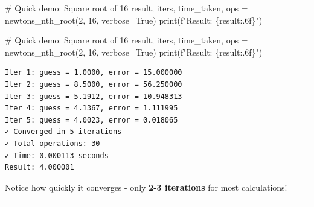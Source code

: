 \documentclass[
  letterpaper,
  DIV=11,
  numbers=noendperiod]{scrartcl}
\newenvironment{Shaded}{\begin{snugshade}}{\end{snugshade}}
\newcommand{\BuiltInTok}[1]{\textcolor[rgb]{0.00,0.23,0.31}{#1}}
\newcommand{\CommentTok}[1]{\textcolor[rgb]{0.37,0.37,0.37}{#1}}
\newcommand{\DecValTok}[1]{\textcolor[rgb]{0.68,0.00,0.00}{#1}}
\newcommand{\NormalTok}[1]{\textcolor[rgb]{0.00,0.23,0.31}{#1}}
\newcommand{\OperatorTok}[1]{\textcolor[rgb]{0.37,0.37,0.37}{#1}}
\newcommand{\SpecialCharTok}[1]{\textcolor[rgb]{0.37,0.37,0.37}{#1}}
\newcommand{\SpecialStringTok}[1]{\textcolor[rgb]{0.13,0.47,0.30}{#1}}
\newcommand{\VariableTok}[1]{\textcolor[rgb]{0.07,0.07,0.07}{#1}}
\begin{document}
\begin{Shaded}
\begin{Highlighting}[]
\CommentTok{\# Quick demo: Square root of 16}
\NormalTok{result, iters, time\_taken, ops }\OperatorTok{=}\NormalTok{ newtons\_nth\_root(}\DecValTok{2}\NormalTok{, }\DecValTok{16}\NormalTok{, verbose}\OperatorTok{=}\VariableTok{True}\NormalTok{)}
\BuiltInTok{print}\NormalTok{(}\SpecialStringTok{f"Result: }\SpecialCharTok{\{}\NormalTok{result}\SpecialCharTok{:.6f\}}\SpecialStringTok{"}\NormalTok{)}
\end{Highlighting}
\end{Shaded}

\begin{Shaded}
\begin{Highlighting}[]
\CommentTok{\# Quick demo: Square root of 16}
\NormalTok{result, iters, time\_taken, ops }\OperatorTok{=}\NormalTok{ newtons\_nth\_root(}\DecValTok{2}\NormalTok{, }\DecValTok{16}\NormalTok{, verbose}\OperatorTok{=}\VariableTok{True}\NormalTok{)}
\BuiltInTok{print}\NormalTok{(}\SpecialStringTok{f"Result: }\SpecialCharTok{\{}\NormalTok{result}\SpecialCharTok{:.6f\}}\SpecialStringTok{"}\NormalTok{)}
\end{Highlighting}
\end{Shaded}

\begin{verbatim}
Iter 1: guess = 1.0000, error = 15.000000
Iter 2: guess = 8.5000, error = 56.250000
Iter 3: guess = 5.1912, error = 10.948313
Iter 4: guess = 4.1367, error = 1.111995
Iter 5: guess = 4.0023, error = 0.018065
✓ Converged in 5 iterations
✓ Total operations: 30
✓ Time: 0.000113 seconds
Result: 4.000001
\end{verbatim}

\begin{tcolorbox}[enhanced jigsaw, rightrule=.15mm, colbacktitle=quarto-callout-tip-color!10!white, titlerule=0mm, toptitle=1mm, colframe=quarto-callout-tip-color-frame, bottomtitle=1mm, coltitle=black, arc=.35mm, breakable, title=\textcolor{quarto-callout-tip-color}{\faLightbulb}\hspace{0.5em}{Key Observation}, bottomrule=.15mm, toprule=.15mm, colback=white, left=2mm, opacityback=0, opacitybacktitle=0.6, leftrule=.75mm]

Notice how quickly it converges - only {\textbf{2-3 iterations}} for
most calculations!

\end{tcolorbox}

\begin{center}\rule{0.5\linewidth}{0.5pt}\end{center}
\end{document}
